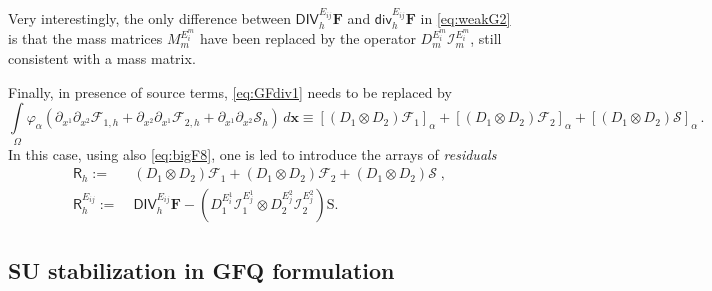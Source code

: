 \documentclass[a4paper,10pt]{article}
\begin{document}
Very interestingly, the only difference between $ \textsf{DIV}_h^{E_{ij}}  \mathbf{F}$ and $\textsf{div}_h^{E_{ij}}  \mathbf{F}$ in \eqref{eq:weakG2} is that 
the mass matrices $M_m^{E_i^{m}}$ have been replaced by the operator $D_m^{E_i^{m}} \mathcal{I}^{E_i^{m}}_m$, still consistent with a mass matrix. 

Finally, in presence of source terms, \eqref{eq:GFdiv1} needs to be replaced by 
\begin{equation}\label{eq:GFdiv4}
\int\limits_\Omega\varphi_{\alpha}\left( \partial_{x^1} \partial_{x^2} \mathcal{F}_{1,h} + \partial_{x^2}\partial_{x^1} \mathcal{F}_{2,h} + \partial_{x^1} \partial_{x^2}\mathcal{S}_h\right)\,d\mathbf{x}\equiv 
\left[( D_1\otimes D_2) \mathcal{F}_1 \right]_{\alpha} +\left[ (D_1\otimes D_2 )\mathcal{F}_2 \right]_{\alpha} +\left[ (D_1\otimes D_2 )\mathcal{S} \right]_{\alpha} \,.
\end{equation}
In this case, using also \eqref{eq:bigF8}, one is led to introduce the arrays of \emph{residuals} 
\begin{equation}\label{eq:GFdiv5}\begin{aligned}
\mathsf{R}_h  :=  &\; ( D_1\otimes D_2) \mathcal{F}_1   + (D_1\otimes D_2 )\mathcal{F}_2 + (D_1\otimes D_2 )\mathcal{S}   \;,\\
\mathsf{R}_h^{E_{ij}}   :=  &\;\textsf{DIV}_h^{E_{ij}}  \mathbf{F}-   ( D_1^{E_i^{1}}  \mathcal{I}^{E_j^{1}}_1\otimes D_2^{E_j^{2}} \mathcal{I}^{E_j^{2}}_2 ) \mathrm{S}.
\end{aligned}
\end{equation}

\subsection{SU stabilization in GFQ formulation}
\end{document}
